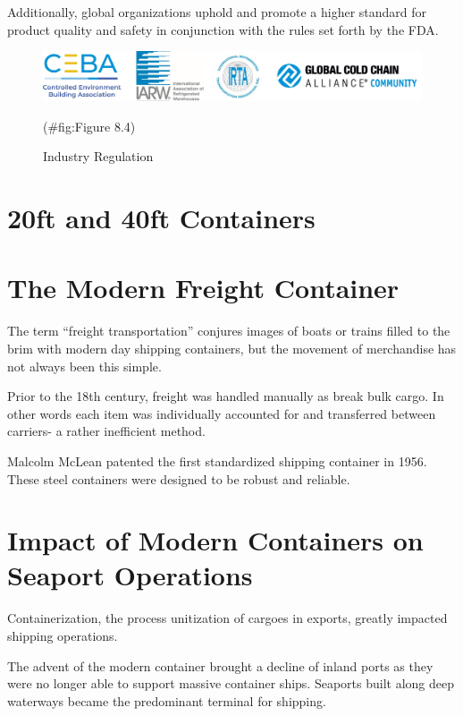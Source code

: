 \documentclass[
]{book}
\begin{document}
Additionally, global organizations uphold and promote a higher standard for product quality and safety in conjunction with the rules set forth by the FDA.

\begin{figure}

{\centering \includegraphics{./Images/seaport operation/Industry Regulation} 

}

\caption{Industry Regulation}(\#fig:Figure 8.4)
\end{figure}

\hypertarget{seaport-20ft40ft}{%
\section{20ft and 40ft Containers}\label{seaport-20ft40ft}}

\hypertarget{seaport-freight}{%
\section{The Modern Freight Container}\label{seaport-freight}}

The term ``freight transportation'' conjures images of boats or trains filled to the brim with modern day shipping containers, but the movement of merchandise has not always been this simple.

Prior to the 18th century, freight was handled manually as break bulk cargo. In other words each item was individually accounted for and transferred between carriers- a rather inefficient method.

Malcolm McLean patented the first standardized shipping container in 1956. These steel containers were designed to be robust and reliable.

\hypertarget{seaport-modern}{%
\section{Impact of Modern Containers on Seaport Operations}\label{seaport-modern}}

Containerization, the process unitization of cargoes in exports, greatly impacted shipping operations.

The advent of the modern container brought a decline of inland ports as they were no longer able to support massive container ships. Seaports built along deep waterways became the predominant terminal for shipping.
\end{document}
